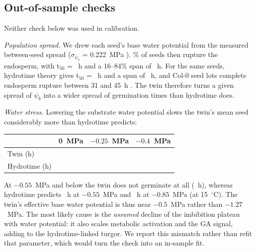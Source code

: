 \documentclass[11pt]{article}
\begin{document}
\subsection{Out-of-sample checks}
Neither check below was used in calibration.

\emph{Population spread.} We drew each seed's base water potential from the measured between-seed spread
($\sigma_{\psi_b}$ = 0.222~MPa \citep{footitt2019}). \PopGroundGmax{}\% of \PopGroundN{} seeds then rupture the endosperm, with
t$_{50}$ = \PopGroundTfifty{}~h and a 16--84\% span of \PopGroundSpread{}~h. For the same seeds, hydrotime theory gives t$_{50}$ =
\PopGroundHydTfifty{}~h and a span of \PopGroundHydSpread{}~h, and Col-0 seed lots complete endosperm rupture between 31 and 45~h
\citep{dekkers2013}. The twin therefore turns a given spread of $\psi_b$ into a wider spread of germination times than hydrotime does.

\emph{Water stress.} Lowering the substrate water potential slows the twin's mean seed considerably more than hydrotime
predicts:

\begin{center}
\begin{tabular}{lccc}
\toprule
 & 0~MPa & $-0.25$~MPa & $-0.4$~MPa \\
\midrule
Twin (h) & \HydZeroModel{} & \HydQuarterModel{} & \HydFortyModel{} \\
Hydrotime (h) & \HydZeroTheory{} & \HydQuarterTheory{} & \HydFortyTheory{} \\
\bottomrule
\end{tabular}
\end{center}

\noindent At $-0.55$~MPa and below the twin does not germinate at all (\HydFiftyFiveModel{}~h), whereas hydrotime predicts
\HydFiftyFiveTheory{}~h at $-0.55$~MPa and \HydEightyFiveTheory{}~h at $-0.85$~MPa (at 15~$^\circ$C). The twin's effective base water
potential is thus near $-0.5$~MPa rather than $-1.27$~MPa. The most likely cause is the \emph{assumed} decline of the imbibition plateau
with water potential: it also scales metabolic activation and the GA signal, adding to the hydrotime-linked turgor. We report this
mismatch rather than refit that parameter, which would turn the check into an in-sample fit.
\end{document}

